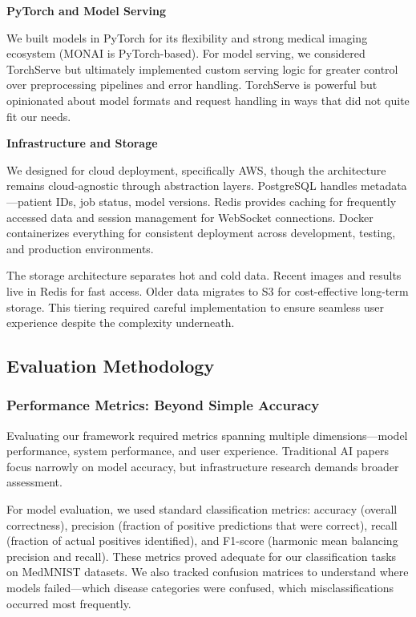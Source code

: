 \documentclass[12pt,a4paper]{article}
\begin{document}
\textbf{PyTorch and Model Serving}

We built models in PyTorch for its flexibility and strong medical imaging ecosystem (MONAI is PyTorch-based). For model serving, we considered TorchServe but ultimately implemented custom serving logic for greater control over preprocessing pipelines and error handling. TorchServe is powerful but opinionated about model formats and request handling in ways that did not quite fit our needs.

\textbf{Infrastructure and Storage}

We designed for cloud deployment, specifically AWS, though the architecture remains cloud-agnostic through abstraction layers. PostgreSQL handles metadata—patient IDs, job status, model versions. Redis provides caching for frequently accessed data and session management for WebSocket connections. Docker containerizes everything for consistent deployment across development, testing, and production environments.

The storage architecture separates hot and cold data. Recent images and results live in Redis for fast access. Older data migrates to S3 for cost-effective long-term storage. This tiering required careful implementation to ensure seamless user experience despite the complexity underneath.

\subsection{Evaluation Methodology}

\subsubsection{Performance Metrics: Beyond Simple Accuracy}

Evaluating our framework required metrics spanning multiple dimensions—model performance, system performance, and user experience. Traditional AI papers focus narrowly on model accuracy, but infrastructure research demands broader assessment.

For model evaluation, we used standard classification metrics: accuracy (overall correctness), precision (fraction of positive predictions that were correct), recall (fraction of actual positives identified), and F1-score (harmonic mean balancing precision and recall). These metrics proved adequate for our classification tasks on MedMNIST datasets. We also tracked confusion matrices to understand where models failed—which disease categories were confused, which misclassifications occurred most frequently.
\end{document}
